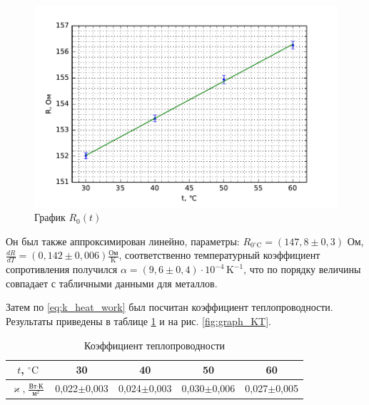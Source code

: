 \documentclass[12pt]{article}
\newcommand{\degC}{^\circ \text{C}}
\newcommand{\fref}[1]{рис. \ref{#1}}
\begin{document}
	\begin{figure}[!h]
		\caption{График $R_0(t)$}
		\label{fig:graph_Rt}
		\begin{center}
		 \includegraphics[scale=.8]{graph-Rt.pdf}
		\end{center}
	\end{figure}
	
	Он был также аппроксимирован линейно, параметры: $R_{0\degC}=(147{,}8\pm 0{,}3)$ Ом, $\frac{dR}{dT}=(0{,}142\pm 0{,}006) \frac{\text{Ом}}{\text{K}}$, соответственно температурный коэффициент сопротивления получился $\alpha=(9{,}6\pm 0{,}4) \cdot 10^{-4} \,\text{K}^{-1}$, что по порядку величины совпадает с табличными данными для металлов.
	
	Затем по \eqref{eq:k_heat_work} был посчитан коэффициент теплопроводности. Результаты приведены в таблице \ref{tb:res_kappa} и на \fref{fig:graph_KT}.
	
	\begin{table}[!h]
		\caption{Коэффициент теплопроводности}
		\label{tb:res_kappa}
		\begin{center}
		\begin{tabular}{|c|cccc|}
			\hline
			$t$, $\degC$ & 30 & 40 & 50 & 60 \\
			\hline
			$\varkappa, \frac{\text{Вт}\cdot \text{К}}{\text{м}^2}$ & 0,022$\pm$0,003 & 0,024$\pm$0,003 & 0,030$\pm$0,006 & 0,027$\pm$0,005 \\
			\hline
		\end{tabular}
		\end{center}
	\end{table}
	
\end{document}
